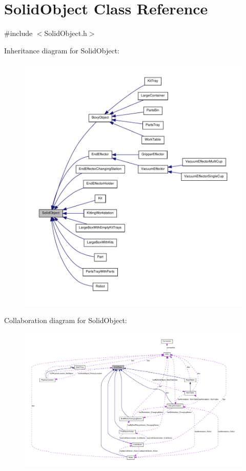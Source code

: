 \hypertarget{class_solid_object}{
\section{SolidObject Class Reference}
\label{class_solid_object}
}


{\ttfamily \#include $<$SolidObject.h$>$}



Inheritance diagram for SolidObject:\nopagebreak
\begin{figure}[H]
\begin{center}
\leavevmode
\includegraphics[width=400pt]{class_solid_object__inherit__graph}
\end{center}
\end{figure}


Collaboration diagram for SolidObject:\nopagebreak
\begin{figure}[H]
\begin{center}
\leavevmode
\includegraphics[width=400pt]{class_solid_object__coll__graph}
\end{center}
\end{figure}
